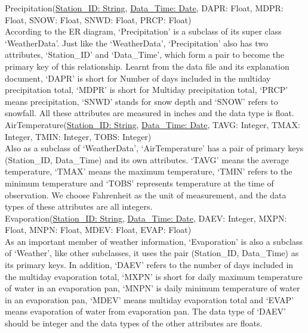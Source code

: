 \documentclass[]{article}
\begin{document}
	\noindent Precipitation(\uline{Station\_ID: String}, \uline{Data\_Time: Date}, DAPR: Float, MDPR: Float, SNOW: Float, SNWD: Float, PRCP: Float)\\
	
	\noindent According to the ER diagram, ‘Precipitation’ is a subclass of its super class ‘WeatherData’. Just like the ‘WeatherData’, ‘Precipitation’ also has two attributes, ‘Station\_ID’ and ‘Data\_Time’, which form a pair to become the primary key of this relationship. Learnt from the data file and its explanation document, ‘DAPR’ is short for Number of days included in the multiday precipitation total, ‘MDPR’ is short for Multiday precipitation total, ‘PRCP’ means precipitation, ‘SNWD’ stands for snow depth and ‘SNOW’ refers to snowfall. All these attributes are measured in inches and the data type is float.  \\
	
	\noindent AirTemperature(\uline{Station\_ID: String}, \uline{Data\_Time: Date}, TAVG: Integer, TMAX: Integer, TMIN: Integer, TOBS: Integer)\\
	
	\noindent Also as a subclass of ‘WeatherData’, ‘AirTemperature’ has a pair of primary keys (Station\_ID, Data\_Time) and its own attributes. ‘TAVG’ means the average temperature, ‘TMAX’ means the maximum temperature, ‘TMIN’ refers to the minimum temperature and ‘TOBS’ represents temperature at the time of observation. We choose Fahrenheit as the unit of measurement, and the data types of these attributes are all integers.   \\
	
	\noindent Evaporation(\uline{Station\_ID: String}, \uline{Data\_Time: Date}, DAEV: Integer, MXPN: Float, MNPN: Float, MDEV: Float, EVAP: Float)\\
	
	\noindent As an important member of weather information, ‘Evaporation’ is also a subclass of ‘Weather’, like other subclasses, it uses the pair (Station\_ID, Data\_Time) as its primary keys. In addition, ‘DAEV’ refers to the number of days included in the multiday evaporation total, ‘MXPN’ is short for daily maximum temperature of water in an evaporation pan, ‘MNPN’ is daily minimum temperature of water in an evaporation pan, ‘MDEV’ means multiday evaporation total and ‘EVAP’ means evaporation of water from evaporation pan. The data type of ‘DAEV’ should be integer and the data types of the other attributes are floats.   \\
	
\end{document}
